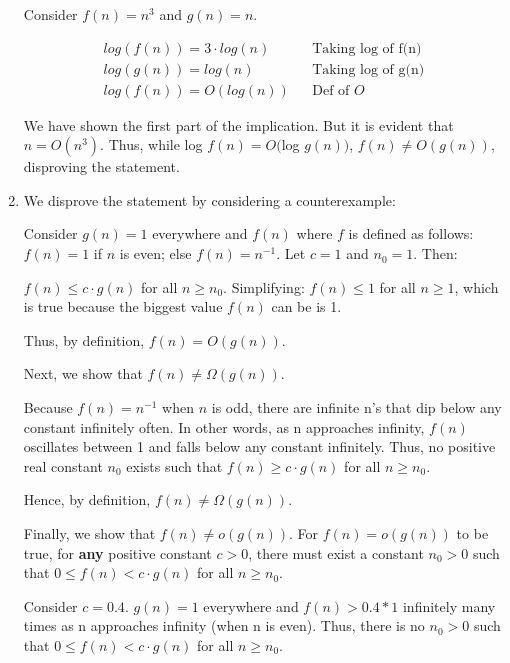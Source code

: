 \documentclass[a4paper]{report}
\begin{document}
\begin{enumerate}
      Consider $f(n) = n^3$ and $g(n) = n$. 

      \begin{align}
        log(f(n)) = 3 \cdot log(n)                    &&\text{Taking log of f(n)}\\
        log(g(n)) = log(n)                            &&\text{Taking log of g(n)}\\
        log(f(n)) = O(log(n))                         &&\text{Def of $O$}
      \end{align}

      We have shown the first part of the implication. But it is evident that $n = O(n^3)$.
      Thus, while log $f(n) = O($log $g(n))$, $f(n) \neq O(g(n))$, disproving the statement.

    \bigskip
    \setcounter{equation}{0}
    \item We disprove the statement by considering a counterexample: 

      Consider $g(n) = 1$ everywhere and $f(n)$ where $f$ is defined as follows: $f(n) = 1$ if $n$ is even; else $f(n) = n^{-1}$.
      Let $c = 1$ and $n_{0} = 1$. Then:

      $f(n) \leq c \cdot g(n)$ for all $n \geq n_{0}$.
      Simplifying: $f(n) \leq 1$ for all $n \geq 1$, which is true because the biggest value $f(n)$ can be is 1.

      Thus, by definition, $f(n) = O(g(n))$.

      Next, we show that $f(n) \neq \Omega(g(n))$.

      Because $f(n) = n^{-1}$ when $n$ is odd, there are infinite n's that dip below any constant infinitely often.
      In other words, as n approaches infinity, $f(n)$ oscillates between 1 and falls below any constant infinitely. 
      Thus, no positive real constant $n_{0}$ exists such that $f(n) \geq c \cdot g(n)$ for all $n \geq n_{0}$.

      Hence, by definition, $f(n) \neq \Omega(g(n))$. 
      
      Finally, we show that $f(n) \neq o(g(n))$.
      For $f(n) = o(g(n))$ to be true, for {\bf any} positive constant $c > 0$, there must exist a constant $n_{0} > 0$ such that
      $0 \leq f(n) < c \cdot g(n)$ for all $n \geq n_{0}$. 

      Consider $c = 0.4$. $g(n) = 1$ everywhere and $f(n) > 0.4 * 1$ infinitely many times as n approaches infinity 
      (when n is even). Thus, there is no $n_{0} > 0 $ such that $0 \leq f(n) < c \cdot g(n)$ for all $n \geq n_{0}$.  
      

\end{enumerate}
\end{document}
